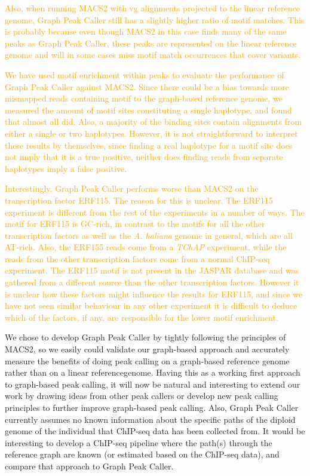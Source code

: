 \documentclass[10pt,letterpaper]{article}
\newcommand{\revision}[1]{\textcolor{orange}{#1}}
\begin{document}
\revision{Also, when running MACS2 with vg alignments projected to the linear reference genome, Graph Peak Caller still has a slightly higher ratio of motif matches. This is probably because even though MACS2 in this case finds many of the same peaks as Graph Peak Caller, these peaks are represented on the linear reference genome and will in some cases miss motif match occurrences that cover variants.}

\revision{We have used motif enrichment within peaks to evaluate the performance of Graph Peak Caller against MACS2. Since there could be a bias towards more mismapped reads containing motif to the graph-based reference genome, we measured the amount of motif sites constituting a single haplotype, and found that almost all did. Also, a majority of the binding sites contain alignments from either a single or two haplotypes. However, it is not straightforward to interpret these results by themselves, since finding a real haplotype for a motif site does not imply that it is a true positive, neither does finding reads from separate haplotypes imply a false positive.}

\revision{Interestingly, Graph Peak Caller performs worse than MACS2 on the transcription factor ERF115. The reason for this is unclear. The ERF115 experiment is different from the rest of the experiments in a number of ways. The motif for ERF115 is GC-rich, in contrast to the motifs for all the other transcription factors as well as the \emph{A. haliana} genome in general, which are all AT-rich. Also, the ERF155 reads come from a \emph{TChAP} experiment, while the reads from the other transcription factors come from a normal ChIP-seq experiment. The ERF115 motif is not present in the JASPAR database and was gathered from a different source than the other transcription factors. However it is unclear how these factors might influence the results for ERF115, and since we have not seen similar behaviour in any other experiment it is difficult to deduce which of the factors, if any, are responsible for the lower motif enrichment.}

We chose to develop Graph Peak Caller by tightly following the principles of MACS2, so we easily could validate our graph-based approach and accurately measure the benefits of doing peak calling on a graph-based reference genome rather than on a linear referencegenome. Having this as a working first approach to graph-based peak calling, it will now be natural and interesting  to extend our work by drawing ideas from other peak callers or develop new peak calling principles to further improve graph-based peak calling. Also, Graph Peak Caller currently assumes no known information about the specific paths of the diploid genome of the individual that ChIP-seq data has been collected from. It would be interesting to develop a ChIP-seq pipeline where the path(s) through the reference graph are known (or estimated based on the ChIP-seq data), and compare that approach to Graph Peak Caller.
\end{document}
